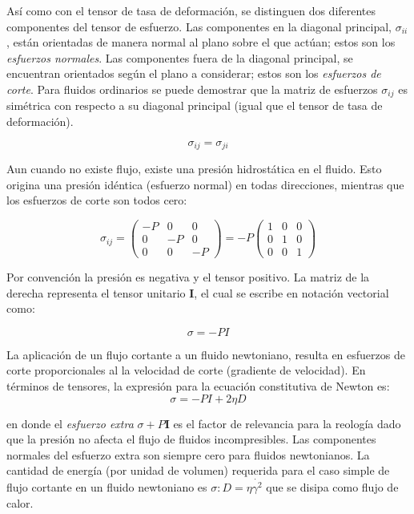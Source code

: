 Así como con el tensor de tasa de deformación, se distinguen dos diferentes componentes del tensor de esfuerzo. Las componentes en la diagonal principal, $\sigma_{ii}$, están orientadas de manera normal al plano sobre el que actúan; estos son los \emph{esfuerzos normales}. Las componentes fuera de la diagonal principal, se encuentran orientados según el plano a considerar; estos son los \emph{esfuerzos de corte}. Para fluidos ordinarios se puede demostrar que la matriz de esfuerzos $\sigma_{ij}$ es simétrica con respecto a su diagonal principal (igual que el tensor de tasa de deformación).

\begin{equation}
\sigma_{ij}=\sigma_{ji}
\end{equation}

Aun cuando no existe flujo, existe una presión hidrostática en el fluido. Esto origina una presión idéntica (esfuerzo normal) en todas direcciones, mientras que los esfuerzos de corte son todos cero:

\begin{equation}
\sigma_{ij}= \left( \begin{matrix}
-P & 0 & 0 \\
0 & -P & 0 \\
0 & 0 & -P
\end{matrix} \right) = -P\left( \begin{matrix}
1&0&0 \\
0&1&0 \\
0&0&1
\end{matrix} \right)
\end{equation}

Por convención la presión es negativa y el tensor positivo. La matriz de la derecha representa el tensor unitario \textbf{I}, el cual se escribe en notación vectorial como:

\begin{equation}
\sigma=-PI
\end{equation}

La aplicación de un flujo cortante a un fluido newtoniano, resulta en esfuerzos de corte proporcionales al la velocidad de corte (gradiente de velocidad). En términos de tensores, la expresión para la ecuación constitutiva de Newton es:
\begin{equation}
\sigma = -PI+2\eta D
\end{equation}

en donde el \emph{esfuerzo extra} $\sigma +P\textbf{I}$ es el factor de relevancia para la reología dado que la presión no afecta el flujo de fluidos incompresibles. Las componentes normales del esfuerzo extra son siempre cero para fluidos newtonianos. La cantidad de energía (por unidad de volumen) requerida para el caso simple de flujo cortante en un fluido newtoniano es $\sigma : D=\eta \dot{\gamma^{2}}$ que se disipa como flujo de calor.

